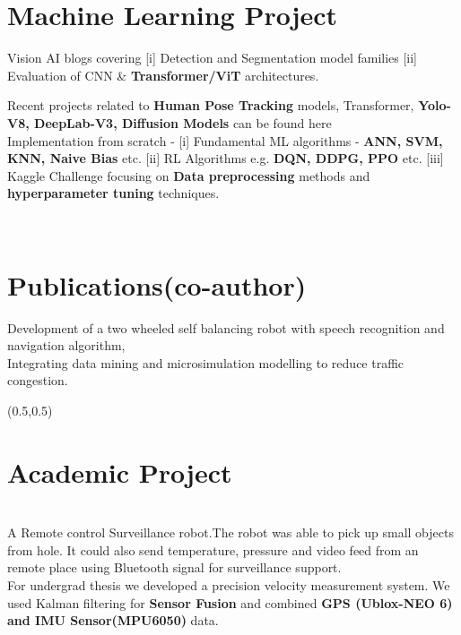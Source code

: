 \documentclass[article]{twentysecondcv_v2} %
\begin{document}
\begin{textblock}{9}
\section{Machine Learning Project}
\begin{multiline} %
\faBookmark[regular] Vision AI blogs covering [i] Detection and Segmentation model families [ii] Evaluation of CNN \& \textbf{Transformer/ViT} architectures. 

\faBookmark[regular] Recent projects related to \textbf{Human Pose Tracking} models, Transformer, \textbf{Yolo-V8, DeepLab-V3, Diffusion Models} can be found here \\
\faBookmark[regular] Implementation from scratch - [i] Fundamental ML algorithms - \textbf{ANN, SVM, KNN, Naive Bias} etc. [ii] RL Algorithms e.g. \textbf{DQN, DDPG, PPO} etc. [iii] Kaggle Challenge focusing on \textbf{Data preprocessing} methods and \textbf{hyperparameter tuning} techniques. 
\end{multiline}\\

\section{Publications(co-author)}
\faBookmark[regular] Development of a two wheeled self balancing robot with speech recognition and navigation algorithm, \\
\faBookmark[regular] Integrating data mining and microsimulation modelling to reduce traffic congestion. \\
\end{textblock}

\strut\newpage
\begin{textblock}{10}(0.5,0.5)

\section{Academic Project}\\
\faBookmark[regular] A Remote control Surveillance robot.The robot was able to pick up small objects from hole. It could also send temperature, pressure and video feed from an remote place using Bluetooth signal for surveillance support.\\
\faBookmark[regular] For undergrad thesis we  developed a precision velocity measurement system. We used Kalman filtering for \textbf{Sensor Fusion} and combined \textbf{GPS (Ublox-NEO 6) and IMU Sensor(MPU6050)} data. 
\end{textblock}
\end{document}
